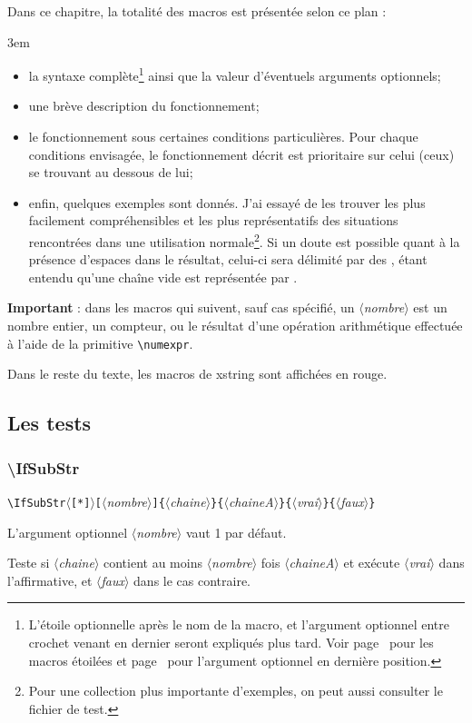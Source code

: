 \documentclass[a4paper,10pt]{article}
\newcommand\guill[1]{\og{}#1\fg{}}
\newcommand\argu[1]{$\langle$\textit{#1}$\rangle$}
\newcommand\ARGU[1]{\texttt{\color{black}\{}\argu{#1}\texttt{\color{black}\}}}
\newcommand\arguC[1]{\texttt{\color{black}[}\argu{#1}\texttt{\color{black}]}}
\newcommand\etoile{$\langle$\texttt{[*]}$\rangle$}
\newcommand\Xstring{\textsf{xstring}\xspace}
\newcommand\verbinline{\lstinline[basicstyle=\normalsize\ttfamily]}
\begin{document}
Dans ce chapitre, la totalité des macros est présentée selon ce plan :\par\nobreak\smallskip
\parindent3em
\begin{itemize}
	\item la syntaxe complète\footnote{L'étoile optionnelle après le nom de la macro, et l'argument optionnel entre crochet venant en dernier seront expliqués plus tard. Voir page~\pageref{macrosetoilees} pour les macros étoilées et page~\pageref{argumentoptionnel} pour l'argument optionnel en dernière position.} ainsi que la valeur d'éventuels arguments optionnels;
	\item une brève description du fonctionnement;
	\item le fonctionnement sous certaines conditions particulières. Pour chaque conditions envisagée, le fonctionnement décrit est prioritaire sur celui (ceux) se trouvant au dessous de lui;
	\item enfin, quelques exemples sont donnés. J'ai essayé de les trouver les plus facilement compréhensibles et les plus représentatifs des situations rencontrées dans une utilisation normale\footnote{Pour une collection plus importante d'exemples, on peut aussi consulter le fichier de test.}. Si un doute est possible quant à la présence d'espaces dans le résultat, celui-ci sera délimité par des \guill{\textbar}, étant entendu qu'une chaîne vide est représentée par \guill{\textbar\textbar}.
\end{itemize}
\parindent0pt\smallskip

\textbf{Important} : dans les macros qui suivent, sauf cas spécifié, un \argu{nombre} est un nombre entier, un compteur, ou le résultat d'une opération arithmétique effectuée à l'aide de la primitive \verb|\numexpr|.\smallskip

Dans le reste du texte, les macros de \Xstring sont affichées en {\makeatletter\color{@xs@keywordsxstring}rouge}.

\subsection{Les tests}
\subsubsection{\ttfamily\textbackslash IfSubStr}
\verbinline|\IfSubStr|\etoile\arguC{nombre}\ARGU{chaine}\ARGU{chaineA}\ARGU{vrai}\ARGU{faux}
\smallskip

L'argument optionnel \argu{nombre} vaut 1 par défaut.\par\nobreak\smallskip
Teste si \argu{chaine} contient au moins \argu{nombre} fois \argu{chaineA} et exécute \argu{vrai} dans l'affirmative, et \argu{faux} dans le cas contraire.\medskip
\end{document}
